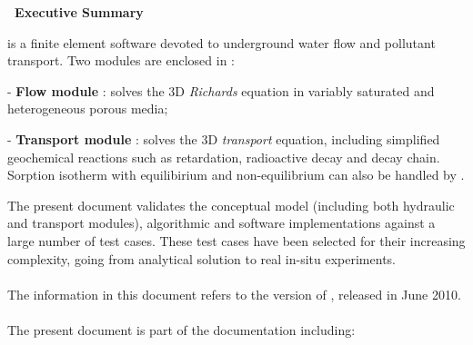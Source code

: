 %
\vspace*{0.1cm}
\begin{center}
\textbf{\large\ Executive Summary}
\end{center}
\vspace*{1cm}

\vspace{0.5cm}
\estel is a finite element software devoted to underground water flow and pollutant transport. Two modules are enclosed in \estel \rel:
\begin{list}{-}{}
\item[-] \textbf{Flow module} : solves the 3D \textit{Richards} equation in variably saturated and heterogeneous porous media;
\item[-] \textbf{Transport module} : solves the 3D \textit{transport} equation, including simplified geochemical reactions such as retardation, radioactive decay and decay chain.
Sorption isotherm with equilibirium and non-equilibrium can also be handled by \estel.
\vspace{0.5cm}
\end{list}
%
The present document validates the \estel \rel conceptual model (including both hydraulic and transport modules), algorithmic and software implementations against a large number of test cases. These test cases have been selected for their increasing complexity, going from analytical solution to real in-situ experiments.\\\\
% 
The information in this document refers to the version \rel of \estel, released in June 2010.\\\\
% 
The present document is part of the \estel documentation including:
